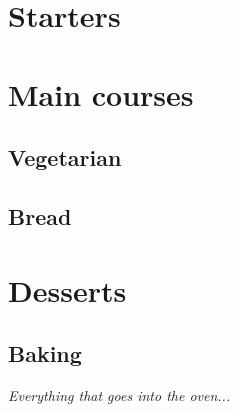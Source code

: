 \documentclass[11pt,paper=a4]{scrbook}
\begin{document}


\tableofcontents                        %


\part{Starters}

\part{Main courses}
\chapter{Vegetarian}

\chapter{Bread}


\part{Desserts}
\chapter{Baking}
\textit{Everything that goes into the oven...} %



\end{document}
